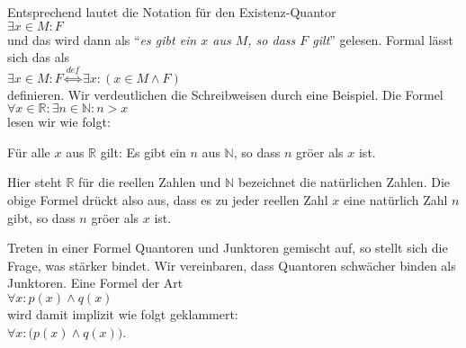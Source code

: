 \begin{enumerate}
      Entsprechend
      lautet die Notation f\"{u}r den Existenz-Quantor \\[0.2cm]
      \hspace*{1.3cm}  $\exists x \in M: F$ \\[0.2cm]
      und das wird dann  als ``\emph{es gibt ein $x$ aus $M$, so dass $F$ gilt}'' gelesen.  
      Formal l\"{a}sst sich das als \\[0.2cm]
      \hspace*{1.3cm} $\exists x \in M: F \stackrel{de\!f}{\Longleftrightarrow} \exists x\colon (x\in M \wedge F)$ \\[0.2cm]
      definieren.       Wir verdeutlichen die Schreibweisen durch eine Beispiel.  Die Formel \\[0.2cm]
      \hspace*{1.3cm} $\forall x \in \mathbb{R}: \exists n \in \mathbb{N} : n > x$ \\[0.2cm]
      lesen wir wie folgt:
      \begin{center}
        {\em
        \begin{minipage}{12cm}
          F\"{u}r alle $x$ aus $\mathbb{R}$ gilt: Es gibt ein $n$ aus $\mathbb{N}$, so dass
          $n$ gr\"{o}\3er als $x$ ist.
        \end{minipage}
        }
      \end{center}
      Hier steht $\mathbb{R}$ f\"{u}r die reellen Zahlen und $\mathbb{N}$ bezeichnet die nat\"{u}rlichen Zahlen.
      Die obige Formel dr\"{u}ckt also aus, dass es zu jeder reellen Zahl $x$ eine nat\"{u}rlich Zahl $n$ gibt, 
      so dass $n$ gr\"{o}\3er als $x$ ist.

      Treten in einer Formel Quantoren und Junktoren gemischt auf, so stellt sich die
      Frage, was st\"{a}rker bindet.  Wir vereinbaren, dass Quantoren schw\"{a}cher binden als
      Junktoren.  Eine Formel der Art \\[0.2cm]
      \hspace*{1.3cm} $\forall x \colon p(x) \wedge q(x)$ \\[0.2cm]
      wird damit implizit wie folgt geklammert: \\[0.2cm]
      \hspace*{1.3cm} $\forall x \colon \bigl(p(x) \wedge q(x)\bigr)$. 
\end{enumerate}


